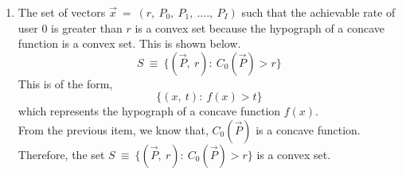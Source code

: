 \documentclass[12pt, draftcls, onecolumn]{IEEEtran}
\begin{document}
\begin{enumerate}
    We know from H{\"o}lder's inequality that,
    \[\sum_{i=1}^N\ x_i y_i\ \leq\ (\sum_{i=1}^N\ |x_i|^p)^\frac{1}{p} (\sum_{i=1}^N\ |y_i|^q)^\frac{1}{q}\]
    Using $x_i\ =\ a_i^{\theta}$, $y_i\ =\ b_i^{\Bar{\theta}}$, $p\ =\ \frac{1}{\theta}$, $q\ =\ \frac{1}{\Bar{\theta}}$, and $N\ =\ I+1$,
    \[\sum_{i=1}^{I+1}\ a_i^{\theta} b_i^{\Bar{\theta}}\ \leq\ (\sum_{i=1}^{I+1}\ a_i^{\theta \frac{1}{\theta}})^{\theta} (\sum_{i=1}^{I+1}\ b_i^{\Bar{\theta} \frac{1}{\Bar{\theta}}})^{\Bar{\theta}}\]
    Taking the log on both sides of the inequality,
    \[log_e[\sum_{i=1}^{I+1}\ a_i^{\theta} b_i^{\Bar{\theta}}]\ \leq\ log_e[(\sum_{i=1}^{I+1}\ a_i^{\theta \frac{1}{\theta}})^{\theta}]+log_e[(\sum_{i=1}^{I+1}\ b_i^{\Bar{\theta} \frac{1}{\Bar{\theta}}})^{\Bar{\theta}}]\]
    \[log_e[\sum_{i=1}^{I+1}\ a_i^{\theta} b_i^{\Bar{\theta}}]\ \leq \theta log_e[\sum_{i=1}^{I+1}\ a_i]+\Bar{\theta}log_e[\sum_{i=1}^{I+1}\ b_i]\]
    Reverting the substitutions,
    \[log_e[\sum_{i=1}^{I+1}\ e^{x_i \theta} e^{y_i \Bar{\theta}}]\ \leq \theta log_e[\sum_{i=1}^{I+1}\ e^{x_i}]+\Bar{\theta}log_e[\sum_{i=1}^{I+1}\ e^{y_i}]\]
    \[log_e[\sum_{i=1}^{I+1}\ e^{\theta x_i+\Bar{\theta} y_i}]\ \leq \theta log_e[\sum_{i=1}^{I+1}\ e^{x_i}]+\Bar{\theta}log_e[\sum_{i=1}^{I+1}\ e^{y_i}]\]
    Hence,
    \[g(\theta \Vec{x} + \Bar{\theta} \Vec{y}) \leq \theta g(\Vec{x}) + \Bar{\theta} \Vec{y}\]
    Therefore, $g(\Vec{x})\ =\ log_e(\sum_{i=1}^I\ e^{x_i}+N_0)$ is a convex function due to which $-g(\Vec{x})\ =\ -log_e(\sum_{i=1}^I\ e^{x_i}+N_0)$ is a concave function.
    \\Since $C_0(\Vec{P})$ is concave, the function $r-C_0(\Vec{P})$ is convex.
    \\If a function is convex, its sub-level sets are convex.
    \\Therefore, $\{\Vec{P}:\ r-C_0(\Vec{P}) < 0\}$ is a convex set.
    \item The set of vectors $\Vec{x}\ =\ (r,\ P_0,\ P_1,\ ....,\ P_I)$ such that the achievable rate of user 0 is greater than $r$ is a convex set because the hypograph of a concave function is a convex set. This is shown below.
    \[S\ \equiv\ \{(\Vec{P},\ r):\ C_0(\Vec{P}) > r\}\]
    This is of the form,
    \[\{(x,\ t):\ f(x) > t\}\]
    which represents the hypograph of a concave function $f(x)$.
    \\From the previous item, we know that, $C_0(\Vec{P})$ is a concave function.
    \\Therefore, the set $S\ \equiv\ \{(\Vec{P},\ r):\ C_0(\Vec{P}) > r\}$ is a convex set.
\end{enumerate}
\end{document}
